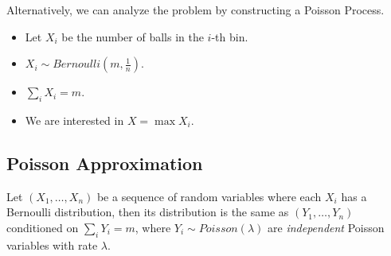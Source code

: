         Alternatively, we can analyze the problem by constructing a Poisson Process.

        \begin{itemize}
            \item Let $X_i$ be the number of balls in the $i$-th bin.
            \item $X_i \sim Bernoulli(m, \frac{1}{n})$.
            \item $\sum_i X_i = m$.
            \item We are interested in $X = \max X_i$.
        \end{itemize}

    \subsection{Poisson Approximation}
        \begin{theorem}\label{Thm:PoissonApproximation}
            Let $(X_1,\dots,X_n)$ be a sequence of random variables where each $X_i$ has a Bernoulli distribution, then its distribution is the same as $(Y_1, \dots, Y_n)$ conditioned on $\sum_i Y_i = m$, where $Y_i \sim Poisson(\lambda)$ are \emph{independent} Poisson variables with rate $\lambda$.
        \end{theorem}

